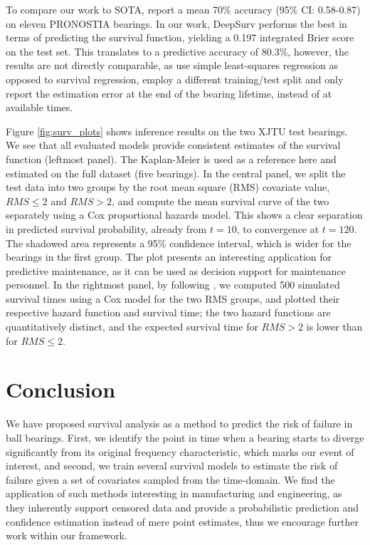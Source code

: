 \documentclass[letterpaper]{article} %
\begin{document}
To compare our work to SOTA, \cite{xu_rul_2022} report a mean 70\% accuracy (95\% CI: 0.58-0.87) on eleven PRONOSTIA bearings. In our work, DeepSurv \cite{katzman_deepsurv_2018} performs the best in terms of predicting the survival function, yielding a 0.197 integrated Brier score on the test set. This translates to a predictive accuracy of 80.3\%, however, the results are not directly comparable, as \cite{xu_rul_2022} use simple least-squares regression as opposed to survival regression, employ a different training/test split and only report the estimation error at the end of the bearing lifetime, instead of at available times.


Figure \ref{fig:surv_plots} shows inference results on the two XJTU test bearings. We see that all evaluated models provide consistent estimates of the survival function (leftmost panel). The Kaplan-Meier is used as a reference here and estimated on the full dataset (five bearings). In the central panel, we split the test data into two groups by the root mean square (RMS) covariate value, $RMS \leq 2$ and $RMS > 2$, and compute the mean survival curve of the two separately using a Cox proportional hazards model. This shows a clear separation in predicted survival probability, already from $t=10$, to convergence at $t=120$. The shadowed area represents a 95\% confidence interval, which is wider for the bearings in the first group. The plot presents an interesting application for predictive maintenance, as it can be used as decision support for maintenance personnel. In the rightmost panel, by following \cite{austin_generating_2012}, we computed 500 simulated survival times using a Cox model for the two RMS groups, and plotted their respective hazard function and survival time; the two hazard functions are quantitatively distinct, and the expected survival time for $RMS > 2$ is lower than for $RMS \leq 2$.

\section{Conclusion}

We have proposed survival analysis as a method to predict the risk of failure in ball bearings. First, we identify the point in time when a bearing starts to diverge significantly from its original frequency characteristic, which marks our event of interest, and second, we train several survival models to estimate the risk of failure given a set of covariates sampled from the time-domain. We find the application of such methods interesting in manufacturing and engineering, as they inherently support censored data and provide a probabilistic prediction and confidence estimation instead of mere point estimates, thus we encourage further work within our framework.
\end{document}
